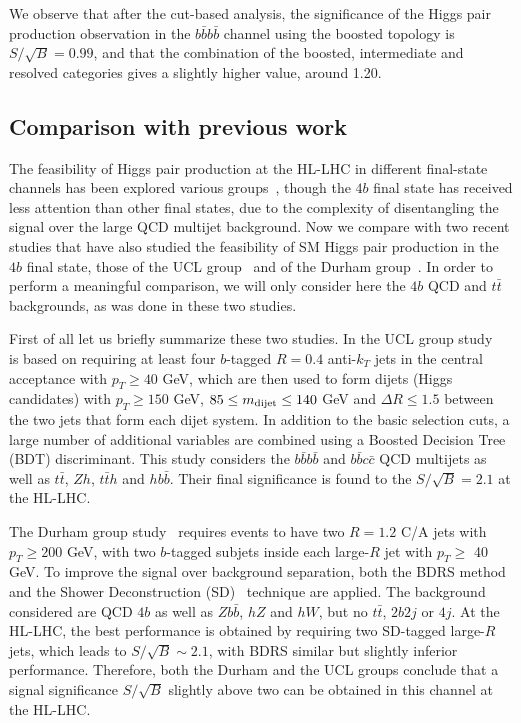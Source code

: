 We observe
that after the cut-based analysis, the significance of the Higgs pair production
observation in the $b\bar{b}b\bar{b}$ channel using the boosted topology
is $S/\sqrt{B}=0.99$,
and that the combination
of the boosted, intermediate and resolved categories gives a slightly higher
value, around 1.20.
%

\subsection{Comparison with previous work}

The feasibility of Higgs pair production at the HL-LHC in different
final-state channels
has been explored various groups~\cite{Baur:2003gp,Barger:2013jfa,
  Baur:2003gpa,Barr:2013tda,Dolan:2013rja,
  Dolan:2012rv,Papaefstathiou:2012qe,Gouzevitch:2013qca,Cooper:2013kia,Wardrope:2014kya,deLima:2014dta}, though
the $4b$ final state has received less attention than other final states,
due to the complexity of disentangling the signal over the large
QCD multijet background.
%
Now we compare with two recent studies that have also studied the
feasibility of SM Higgs pair production in the $4b$ final state,
those of the UCL group~\cite{Wardrope:2014kya} and of the
Durham group~\cite{deLima:2014dta}.
%
In order to perform a meaningful comparison, we will only consider
here the $4b$ QCD and $t\bar{t}$ backgrounds, as was done
in these two studies.

First of all let us briefly summarize these two studies.
%
In the UCL group study~\cite{Wardrope:2014kya} is based
on requiring at least four $b$-tagged $R=0.4$ anti-$k_T$ jets
in the central acceptance with $p_T \ge 40$ GeV, which are
then used to form dijets (Higgs candidates) with
$p_T \ge 150$ GeV, $85 \le m_{\rm dijet} \le 140$ GeV
and $\Delta R \le 1.5$ between the two jets that form
each dijet system.
%
In addition to the basic selection cuts, a large number
of additional variables are combined using a
Boosted Decision Tree (BDT) discriminant.
%
This study considers the $b\bar{b}b\bar{b}$ and
$b\bar{b}c\bar{c}$ QCD multijets as well as
$t\bar{t}$, $Zh$, $t\bar{t}h$ and $hb\bar{b}$.
%
Their final significance is found to the $S/\sqrt{B}=2.1$ at the HL-LHC.

The Durham group study~\cite{deLima:2014dta} requires events
to have two $R=1.2$ C/A jets with $p_T\ge 200$ GeV, with
two $b$-tagged subjets inside each large-$R$ jet with
$p_T \ge$ 40 GeV.
%
To improve the signal over background separation, both the BDRS
method and the Shower Deconstruction (SD)~\cite{Soper:2011cr,Soper:2012pb}
technique are applied.
%
The background considered are QCD $4b$ as well as $Zb\bar{b}$, $hZ$ and
$hW$, but no $t\bar{t}$, $2b2j$ or $4j$.
%
At the HL-LHC, the best performance is obtained by requiring two
SD-tagged large-$R$ jets, which leads to $S/\sqrt{B}\sim 2.1$,
with BDRS similar but slightly inferior performance.
%
Therefore, both the Durham and the UCL groups conclude that a signal
significance $S/\sqrt{B}$ slightly above two can  be obtained
in this channel at the HL-LHC.

